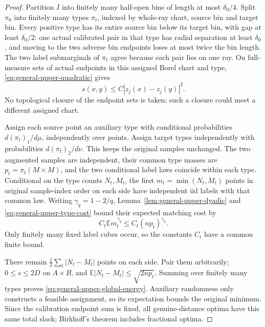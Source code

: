\documentclass[11pt,reqno]{amsart}
\theoremstyle{definition}
\theoremstyle{remark}
\numberwithin{equation}{section}
\newcommand{\E}{\mathbb E}
\begin{document}
\begin{proof}
Partition \(I\) into finitely many half-open bins of length at most
\(\delta_0/4\). Split \(\pi_0\) into finitely many types
\(\pi_t\), indexed by whole-ray chart, source bin and target bin.
Every positive type has its entire source bin below its target bin,
with gap at least \(\delta_0/2\): one actual calibrated pair in that
type has radial separation at least \(\delta_0\), and moving to the
two adverse bin endpoints loses at most twice the bin length.
The two label submarginals of \(\pi_t\) agree because each pair lies
on one ray. On full-measure sets of actual endpoints in this assigned
Borel chart and type, \eqref{eq:general-upper-quadratic} gives
\begin{equation}
\label{eq:general-upper-type-cost}
 s(x,y)\le C|z_j(x)-z_j(y)|^2.
\end{equation}
No topological closure of the endpoint sets is taken; such a closure
could meet a different assigned chart.

Assign each source point an auxiliary type with conditional
probabilities \(d(\pi_t)_1/d\mu\), independently over points.
Assign target types independently with probabilities
\(d(\pi_t)_2/d\nu\). This keeps the original samples unchanged.
The two augmented samples are independent, their common type masses
are \(p_t=\pi_t(M\times M)\), and the two conditional label laws
coincide within each type. Conditional on the type counts \(N_t,M_t\),
the first \(m_t=\min(N_t,M_t)\) points in original sample-index
order on each side have independent iid labels with that common law.
Writing \(\gamma_q=1-2/q\),
Lemma~\ref{lem:general-upper-dyadic} and
\eqref{eq:general-upper-type-cost} bound their expected matching
cost by
\[
 C_t\E m_t^{\gamma_q}\le C_t(np_t)^{\gamma_q}.
\]
Only finitely many fixed label cubes occur, so the constants \(C_t\)
have a common finite bound.

There remain \(\tfrac12\sum_t|N_t-M_t|\) points on each side.
Pair them arbitrarily; \(0\le s\le2D\) on \(A\times B\), and
\(\E|N_t-M_t|\le\sqrt{2np_t}\). Summing over finitely many types
proves \eqref{eq:general-upper-global-energy}. Auxiliary randomness
only constructs a feasible assignment, so its expectation bounds
the original minimum. Since the calibration endpoint sum is fixed,
all genuine-distance optima have this same total slack; Birkhoff's
theorem includes fractional optima.


\end{proof}
\end{document}
